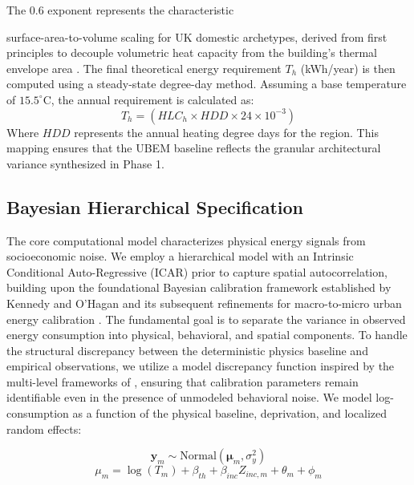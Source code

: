\documentclass[11pt, a4paper, twocolumn]{article}
\begin{document}
The \(0.6\) exponent represents the characteristic

surface-area-to-volume scaling for UK domestic archetypes, derived from
first principles to decouple volumetric heat capacity from the
building's thermal envelope area \cite{ISO13789, Evans1980}.
 The final theoretical energy requirement
\(T_h\) (kWh/year) is then computed using a steady-state degree-day
method. Assuming a base temperature of \(15.5^\circ\)C, the annual
requirement is calculated as: \begin{equation}
T_h = \left( HLC_h \times HDD \times 24 \times 10^{-3} \right)
\end{equation} Where \(HDD\) represents the annual heating degree days
for the region. This mapping ensures that the UBEM baseline reflects the
granular architectural variance synthesized in Phase 1.

\subsection{Bayesian Hierarchical
Specification}\label{bayesian-hierarchical-specification}

The core computational model characterizes physical energy signals from
socioeconomic noise. We employ a hierarchical model with an Intrinsic
Conditional Auto-Regressive (ICAR) prior to capture spatial
autocorrelation, building upon the foundational Bayesian calibration
framework established by Kennedy and O'Hagan \cite{Kennedy2001} and its subsequent
refinements for macro-to-micro urban energy calibration \cite{Booth2013}. 
The fundamental goal is to separate the variance in observed energy 
consumption into physical, behavioral, and spatial components. To handle 
the structural discrepancy between the deterministic physics baseline 
and empirical observations, we utilize a model discrepancy function 
inspired by the multi-level frameworks of \cite{Wang2021}, ensuring 
that calibration parameters remain identifiable even in the presence of 
unmodeled behavioral noise. We model log-consumption as a function of 
the physical baseline, deprivation, and localized random effects:

\[ \bm{y}_m \sim \text{Normal}(\bm{\mu}_m, \sigma_y^2) \]
\[ \mu_{m} = \log(T_{m}) + \beta_{th} + \beta_{inc} Z_{inc, m} + \theta_m + \phi_m \]
\end{document}
